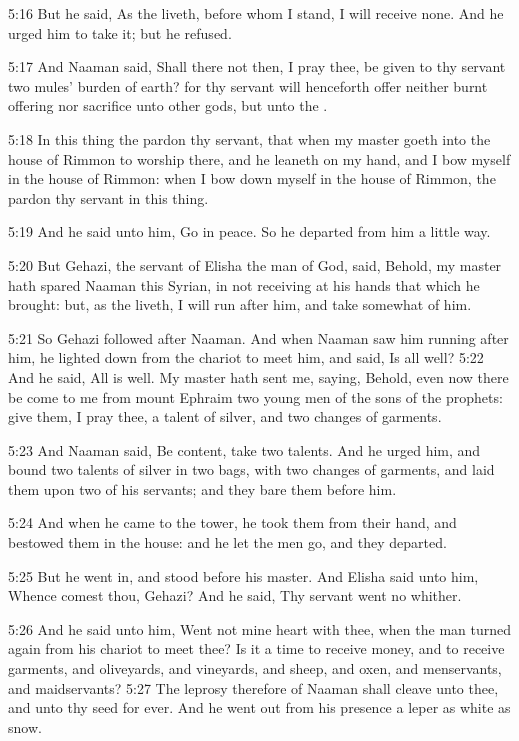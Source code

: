 5:16 But he said, As the \LORD liveth, before whom I stand, I will
receive none. And he urged him to take it; but he refused.

5:17 And Naaman said, Shall there not then, I pray thee, be given to
thy servant two mules' burden of earth? for thy servant will
henceforth offer neither burnt offering nor sacrifice unto other gods,
but unto the \LORD.

5:18 In this thing the \LORD pardon thy servant, that when my master
goeth into the house of Rimmon to worship there, and he leaneth on my
hand, and I bow myself in the house of Rimmon: when I bow down myself
in the house of Rimmon, the \LORD pardon thy servant in this thing.

5:19 And he said unto him, Go in peace. So he departed from him a
little way.

5:20 But Gehazi, the servant of Elisha the man of God, said, Behold,
my master hath spared Naaman this Syrian, in not receiving at his
hands that which he brought: but, as the \LORD liveth, I will run after
him, and take somewhat of him.

5:21 So Gehazi followed after Naaman. And when Naaman saw him running
after him, he lighted down from the chariot to meet him, and said, Is
all well?  5:22 And he said, All is well. My master hath sent me,
saying, Behold, even now there be come to me from mount Ephraim two
young men of the sons of the prophets: give them, I pray thee, a
talent of silver, and two changes of garments.

5:23 And Naaman said, Be content, take two talents. And he urged him,
and bound two talents of silver in two bags, with two changes of
garments, and laid them upon two of his servants; and they bare them
before him.

5:24 And when he came to the tower, he took them from their hand, and
bestowed them in the house: and he let the men go, and they departed.

5:25 But he went in, and stood before his master. And Elisha said unto
him, Whence comest thou, Gehazi? And he said, Thy servant went no
whither.

5:26 And he said unto him, Went not mine heart with thee, when the man
turned again from his chariot to meet thee? Is it a time to receive
money, and to receive garments, and oliveyards, and vineyards, and
sheep, and oxen, and menservants, and maidservants?  5:27 The leprosy
therefore of Naaman shall cleave unto thee, and unto thy seed for
ever. And he went out from his presence a leper as white as snow.


